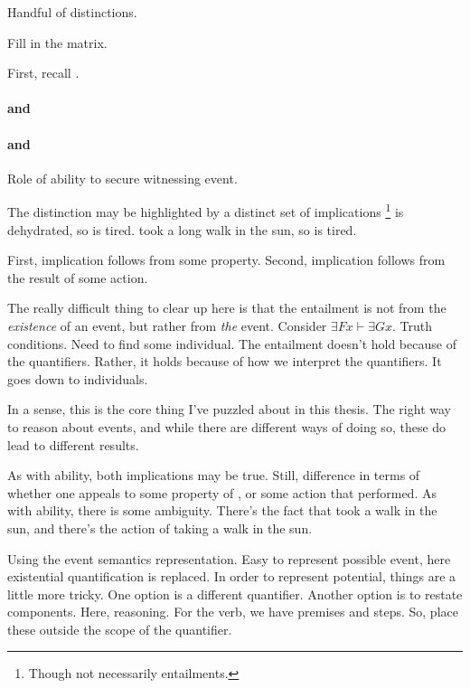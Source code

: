 \begin{note}
  Handful of distinctions.

  Fill in the matrix.

  First, recall \gsi{}.
\end{note}


\paragraph{\AR{} and \nr{}}



\paragraph{\AR{} and \ur{}}




\begin{note}
  Role of ability to secure witnessing event.

  The distinction may be highlighted by a distinct set of implications\nolinebreak
  \footnote{
    Though not necessarily entailments.
  }
   is dehydrated, so  is tired.
   took a long walk in the sun, so  is tired.

  First, implication follows from some property.
  Second, implication follows from the result of some action.
  {
    \color{red}
    The really difficult thing to clear up here is that the entailment is not from the \emph{existence} of an event, but rather from \emph{the} event.
    Consider \(\exists Fx \vdash \exists Gx\).
    Truth conditions.
    Need to find some individual.
    The entailment doesn't hold because of the quantifiers.
    Rather, it holds because of how we interpret the quantifiers.
    It goes down to individuals.

    In a sense, this is the core thing I've puzzled about in this thesis.
    The right way to reason about events, and while there are different ways of doing so, these do lead to different results.
  }
  As with ability, both implications may be true.
  Still, difference in terms of whether one appeals to some property of , or some action that  performed.
  As with ability, there is some ambiguity.
  There's the fact that  took a walk in the sun, and there's the action of  taking a walk in the sun.
\end{note}


\begin{note}[More on \WR{}]
  \color{red}
  Using the event semantics representation.
  Easy to represent possible event, here existential quantification is replaced.
  In order to represent potential, things are a little more tricky.
  One option is a different quantifier.
  Another option is to restate components.
  Here, reasoning.
  For the verb, we have premises and steps.
  So, place these outside the scope of the quantifier.
\end{note}

